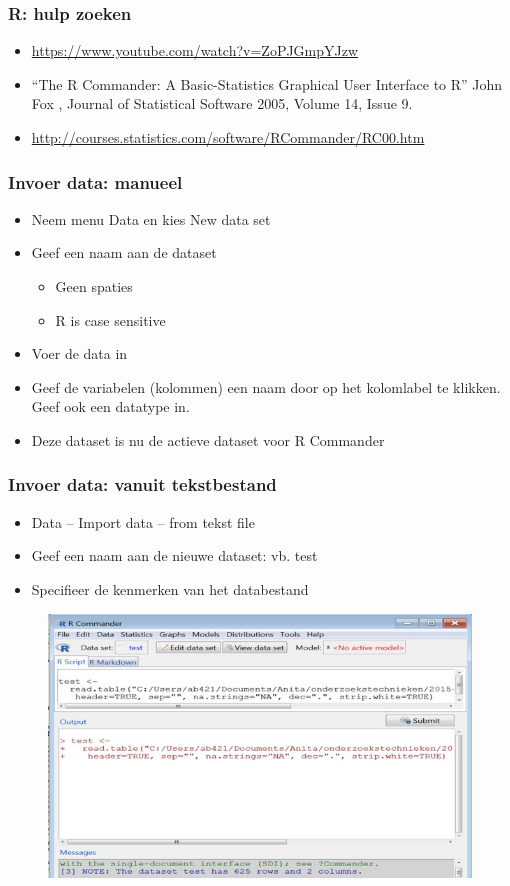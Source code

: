 \documentclass{beamer}
\begin{document}
\begin{frame}
  \frametitle{R: hulp zoeken}
  \begin{itemize}
    \item \url{https://www.youtube.com/watch?v=ZoPJGmpYJzw}
    \item ``The R Commander: A Basic-Statistics Graphical User Interface to R'' John Fox , Journal of Statistical Software 2005, Volume 14, Issue 9.
    \item \url{http://courses.statistics.com/software/RCommander/RC00.htm}
  \end{itemize}
\end{frame}

\begin{frame}
  \frametitle{Invoer data: manueel}
  \begin{itemize}
    \item Neem menu Data en kies New data set
    \item Geef een naam aan de dataset
      \begin{itemize}
        \item Geen spaties
        \item R is case sensitive
      \end{itemize}
    \item Voer de data in
    \item Geef de variabelen (kolommen) een naam door op het kolomlabel te klikken. Geef ook een datatype in.
    \item Deze dataset is nu de actieve dataset voor R Commander
  \end{itemize}
\end{frame}

\begin{frame}
  \frametitle{Invoer data: vanuit tekstbestand}
  \begin{itemize}
    \item Data -- Import data -- from tekst file
    \item Geef een naam aan de nieuwe dataset: vb. test
    \item Specifieer de kenmerken van het databestand
  \end{itemize}

  \begin{figure}[h]
    \centering
    \includegraphics[width=\textwidth]{img/oef3/inlezen-tekstbestand}
  \end{figure}
\end{frame}
\end{document}
